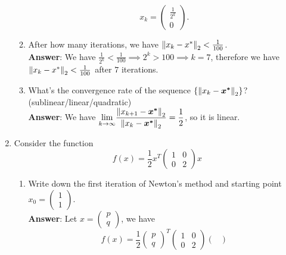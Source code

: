 \documentclass{article}
\begin{document}
\begin{enumerate}
\begin{enumerate}
                        \[
                              x_k=\begin{pmatrix}
                                    \frac{1}{2^k} \\0
                              \end{pmatrix}.
                        \]
                  \item After how many iterations, we have $\norm{x_k-x^*}_2<\frac{1}{100}$.\\
                        \textbf{Answer}: We have $\frac{1}{2^k}<\frac{1}{100}\implies 2^k>100\implies k=7$, therefore we have $\norm{x_k-x^*}_2<\frac{1}{100}$ after $7$ iterations.
                  \item What's the convergence rate of the sequence $\{\norm{x_k-\bm{x^*}}_2\}$? (sublinear/linear/quadratic)\\
                        \textbf{Answer}: We have $\mathlarger{\lim_{k\rightarrow\infty}}\dfrac{\norm{x_{k+1}-\bm{x^*}}_2}{\norm{x_k-\bm{x^*}}_2}=\dfrac{1}{2}$, so it is linear.
            \end{enumerate}
      \item Consider the function \[f(x)=\dfrac{1}{2}x^T\begin{pmatrix}1&0\\0&2\end{pmatrix}x\]
            \begin{enumerate}
                  \item Write down the first iteration of Newton's method and starting point $x_0=\begin{pmatrix}1\\1\end{pmatrix}$.\\
                        \textbf{Answer}: Let $x=\begin{pmatrix}
                                    p \\q
                              \end{pmatrix}$, we have \[
                              f(x)=\dfrac{1}{2}\begin{pmatrix}
                                    p \\q
                              \end{pmatrix}^T\begin{pmatrix}
                                    1 & 0 \\0&2
                              \end{pmatrix}\begin{pmatrix}

\end{pmatrix}\]
\end{enumerate}
\end{enumerate}
\end{document}
